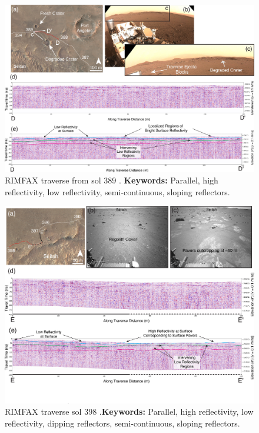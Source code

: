 \begin{figure}[h!]
    \centering
    \includegraphics[width=0.9\linewidth]{Figures/0.5RIMFAX/Shoemaker_2024-f10.jpg}
    \caption[RIMFAX traverse from sol 389]{RIMFAX traverse from sol 389 \citep{shoemaker2024}. \textbf{Keywords:} Parallel, high reflectivity, low reflectivity, semi-continuous, sloping reflectors.}
    \label{fig:Shoemaker24-10}
\end{figure}

\begin{figure}[h!]
    \centering
    \includegraphics[width=0.9\linewidth]{Figures/0.5RIMFAX/Shoemaker_2024-f12.jpg}
    \caption[RIMFAX traverse sol 398.]{RIMFAX traverse sol 398 \citep{shoemaker2024}.\textbf{Keywords:} Parallel, high reflectivity, low reflectivity, dipping reflectors, semi-continuous, sloping reflectors.}
    \label{fig:Shoemaker24-12}
\end{figure}

